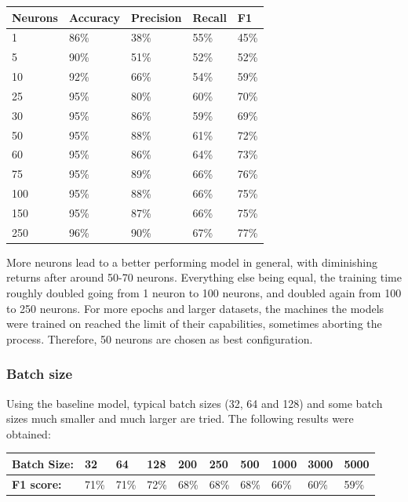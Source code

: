 \documentclass[
	a4paper,
	pagesize,
	pdftex,
	12pt,
	twoside, %
	BCOR=5mm, %
	ngerman,
	fleqn,
	final,
	]{scrartcl}
\begin{document}
\begin{tabular}{ | p{2cm} || p{2cm}|p{2cm}|p{2cm}|p{2cm}|  }
	\hline
	Neurons & Accuracy & Precision & Recall & F1 \\
	\hline
	1 & 86\% & 38\% & 55\% & 45\% \\
	5 & 90\% &  51\% &  52\% &  52\% \\
	10 & 92\% &  66\% &  54\% &  59\% \\
	25 & 95\% &  80\% &  60\% &  70\% \\
	30 & 95\% &  86\% &  59\% &  69\% \\
	50 & 95\% &  88\% &  61\% &  72\% \\
	60 & 95\% &  86\% &  64\% &  73\%\\
	75 & 95\% &  89\% &  66\% &  76\% \\
	100 & 95\% &  88\% &  66\% &  75\% \\
	150 & 95\% &  87\% &  66\% &  75\% \\
	250 & 96\% &  90\% &  67\% &  77\% \\
	\hline
	\hline
\end{tabular}

More neurons lead to a better performing model in general, with diminishing returns after around 50-70 neurons. Everything else being equal, the training time roughly doubled going from 1 neuron to 100 neurons, and doubled again from 100 to 250 neurons. For more epochs and larger datasets, the machines the models were trained on reached the limit of their capabilities, sometimes aborting the process. Therefore, 50 neurons are chosen as best configuration.

\subsubsection{Batch size}
Using the baseline model, typical batch sizes (32, 64 and 128) and some batch sizes much smaller and much larger are tried. The following results were obtained: 

\begin{tabular} { | p{3cm} || p{0.8cm} | p{0.8cm}  | p{0.8cm}  |p{0.8cm} | p{0.8cm} | p{0.8cm} | p{0.8cm} | p{0.8cm}| p{0.8cm} |}
	\hline
	\textbf{Batch Size:}  &  32 & 64 & 128 & 200 & 250 & 500 & 1000 & 3000 &5000\\   
	\hline
	\textbf{F1 score:} & 71\% & 71\% & 72\% & 68\% & 68\% & 68\% & 66\% & 60\% & 59\%\\
	\hline
	\hline
\end{tabular}
\end{document}
